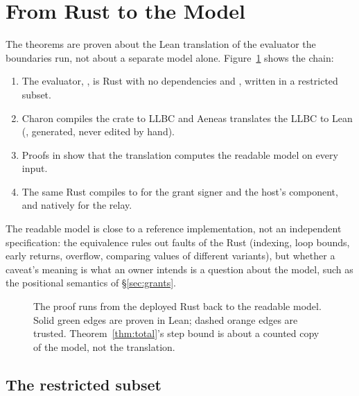 \section{From Rust to the Model}\label{sec:proofs}

The theorems are proven about the Lean translation of the evaluator the
boundaries run, not about a separate model alone. Figure~\ref{fig:pipeline}
shows the chain:
\begin{enumerate}
\item The evaluator, , is  Rust with no
  dependencies and , written in a restricted subset.
\item Charon compiles the crate to LLBC and Aeneas translates the LLBC to Lean
  (, generated, never
  edited by hand).
\item Proofs in  show that the
  translation computes the readable model on every input.
\item The same Rust compiles to  for the grant signer and
  the host's component, and natively for the relay.
\end{enumerate}
The readable model is close to a reference implementation, not an independent
specification: the equivalence rules out faults of the Rust (indexing, loop
bounds, early returns, overflow, comparing values of different variants), but
whether a caveat's meaning is what an owner intends is a question about the
model, such as the positional semantics of \S\ref{sec:grants}.

\begin{figure}[t]
\centering
\resizebox{\linewidth}{!}{}
\caption{The proof runs from the deployed Rust back to the readable model.
Solid green edges are proven in Lean; dashed orange edges are trusted.
Theorem~\ref{thm:total}'s step bound is about a counted copy of the model, not
the translation.}
\label{fig:pipeline}
\end{figure}

\subsection{The restricted subset}


